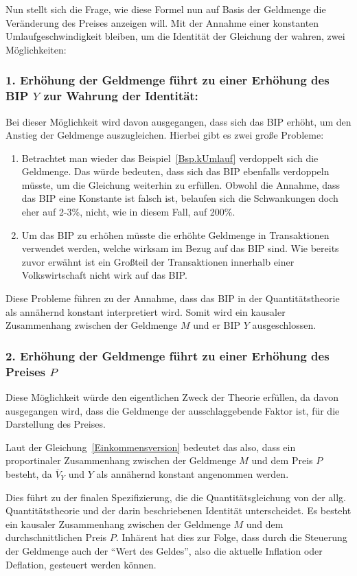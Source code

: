 Nun stellt sich die Frage, wie diese Formel nun auf Basis der Geldmenge die Veränderung des Preises anzeigen will. Mit der Annahme einer konstanten Umlaufgeschwindigkeit bleiben, um die Identität der Gleichung der wahren, zwei Möglichkeiten:

\subsubsection*{1. Erhöhung der Geldmenge führt zu einer Erhöhung des BIP $Y$ zur Wahrung der Identität:}
Bei dieser Möglichkeit wird davon ausgegangen, dass sich das BIP erhöht, um den Anstieg der Geldmenge auszugleichen. Hierbei gibt es zwei große Probleme:

\begin{enumerate}
    \item Betrachtet man wieder das Beispiel\, \vref*{Bsp.kUmlauf} verdoppelt sich die Geldmenge. Das würde bedeuten, dass sich das BIP ebenfalls verdoppeln müsste, um die Gleichung weiterhin zu erfüllen. Obwohl die Annahme, dass das BIP eine Konstante ist falsch ist, belaufen sich die Schwankungen doch eher auf 2-3\%, nicht, wie in diesem Fall, auf 200\%.
    \item Um das BIP zu erhöhen müsste die erhöhte Geldmenge in Transaktionen verwendet werden, welche wirksam im Bezug auf das BIP sind. Wie bereits zuvor erwähnt ist ein Großteil der Transaktionen innerhalb einer Volkswirtschaft nicht wirk auf das BIP.
\end{enumerate}

Diese Probleme führen zu der Annahme, dass das BIP in der Quantitätstheorie als annähernd konstant interpretiert wird. Somit wird ein kausaler Zusammenhang zwischen der Geldmenge $M$ und er BIP $Y$ ausgeschlossen.

\subsubsection*{2. Erhöhung der Geldmenge führt zu einer Erhöhung des Preises $P$}
Diese Möglichkeit würde den eigentlichen Zweck der Theorie erfüllen, da davon ausgegangen wird, dass die Geldmenge der ausschlaggebende Faktor ist, für die Darstellung des Preises.

Laut der Gleichung\, \vref*{Einkommensversion} bedeutet das also, dass ein proportinaler Zusammenhang zwischen der Geldmenge $M$ und dem Preis $P$ besteht, da $\overline{V}_Y$ und $Y$ als annähernd konstant angenommen werden.

Dies führt zu der finalen Spezifizierung, die die Quantitätsgleichung von der allg. Quantitätstheorie und der darin beschriebenen Identität unterscheidet. Es besteht ein kausaler Zusammenhang zwischen der Geldmenge $M$ und dem durchschnittlichen Preis $P$.
Inhärent hat dies zur Folge, dass durch die Steuerung der Geldmenge auch der \enquote{Wert des Geldes}, also die aktuelle Inflation oder Deflation, gesteuert werden können.

